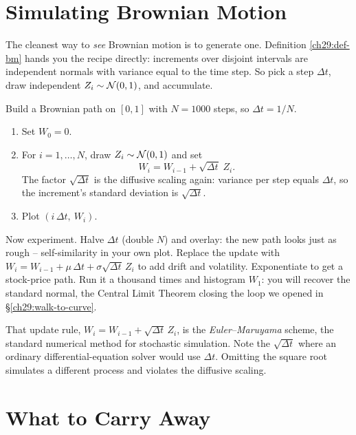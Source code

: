 \section{Simulating Brownian Motion}
\label{ch29:simulate}

The cleanest way to \emph{see} Brownian motion is to generate one. Definition
\ref{ch29:def-bm} hands you the recipe directly: increments over disjoint
intervals are independent normals with variance equal to the time step. So pick a
step $\Delta t$, draw independent $Z_i\sim\mathcal{N}(0,1)$, and accumulate.

\begin{labbox}
Build a Brownian path on $[0,1]$ with $N=1000$ steps, so $\Delta t = 1/N$.
\begin{enumerate}
  \item Set $W_0 = 0$.
  \item For $i=1,\dots,N$, draw $Z_i\sim\mathcal{N}(0,1)$ and set
  \[
    W_i = W_{i-1} + \sqrt{\Delta t}\; Z_i.
  \]
  The factor $\sqrt{\Delta t}$ is the diffusive scaling again: variance per step
  equals $\Delta t$, so the increment's standard deviation is $\sqrt{\Delta t}$.
  \item Plot $(i\,\Delta t,\ W_i)$.
\end{enumerate}
Now experiment. Halve $\Delta t$ (double $N$) and overlay: the new path looks just
as rough -- self-similarity in your own plot. Replace the update with
$W_i = W_{i-1} + \mu\,\Delta t + \sigma\sqrt{\Delta t}\,Z_i$ to add drift and
volatility. Exponentiate to get a stock-price path. Run it a thousand times and
histogram $W_1$: you will recover the standard normal, the Central Limit Theorem
closing the loop we opened in \S\ref{ch29:walk-to-curve}.
\end{labbox}

\begin{remark}
That update rule, $W_i = W_{i-1} + \sqrt{\Delta t}\,Z_i$, is the
\emph{Euler--Maruyama} scheme, the standard numerical method for stochastic simulation. Note the
$\sqrt{\Delta t}$ where an ordinary differential-equation solver would use
$\Delta t$. Omitting the square root simulates a different process and violates the diffusive scaling.
\end{remark}

\section{What to Carry Away}
\label{ch29:summary}

